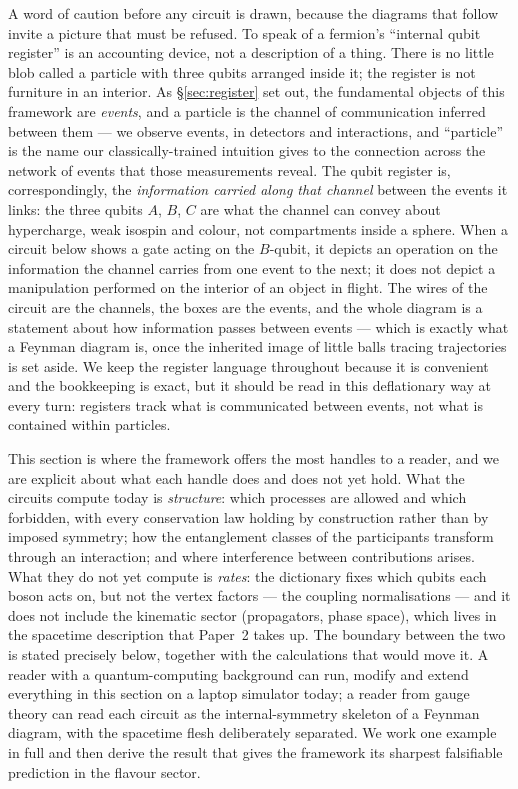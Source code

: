 A word of caution before any circuit is drawn, because the diagrams that follow invite a picture
that must be refused. To speak of a fermion's ``internal qubit register'' is an accounting device,
not a description of a thing. There is no little blob called a particle with three qubits arranged
inside it; the register is not furniture in an interior. As \S\ref{sec:register} set out, the
fundamental objects of this framework are \emph{events}, and a particle is the channel of
communication inferred between them --- we observe events, in detectors and interactions, and
``particle'' is the name our classically-trained intuition gives to the connection across the
network of events that those measurements reveal. The qubit register is, correspondingly, the
\emph{information carried along that channel} between the events it links: the three qubits
$A$, $B$, $C$ are what the channel can convey about hypercharge, weak isospin and colour, not
compartments inside a sphere. When a circuit below shows a gate acting on the $B$-qubit, it depicts
an operation on the information the channel carries from one event to the next; it does not depict a
manipulation performed on the interior of an object in flight. The wires of the circuit are the
channels, the boxes are the events, and the whole diagram is a statement about how information
passes between events --- which is exactly what a Feynman diagram is, once the inherited image of
little balls tracing trajectories is set aside. We keep the register language throughout because it
is convenient and the bookkeeping is exact, but it should be read in this deflationary way at every
turn: registers track what is communicated between events, not what is contained within particles.

This section is where the framework offers the most handles to a reader, and we are explicit about
what each handle does and does not yet hold. What the circuits compute today is \emph{structure}:
which processes are allowed and which forbidden, with every conservation law holding by construction
rather than by imposed symmetry; how the entanglement classes of the participants transform through
an interaction; and where interference between contributions arises. What they do not yet compute is
\emph{rates}: the dictionary fixes which qubits each boson acts on, but not the vertex factors ---
the coupling normalisations --- and it does not include the kinematic sector (propagators, phase
space), which lives in the spacetime description that Paper~2 takes up. The boundary between the two
is stated precisely below, together with the calculations that would move it. A reader with a
quantum-computing background can run, modify and extend everything in this section on a laptop
simulator today; a reader from gauge theory can read each circuit as the internal-symmetry skeleton
of a Feynman diagram, with the spacetime flesh deliberately separated. We work one example in full
and then derive the result that gives the framework its sharpest falsifiable prediction in the
flavour sector.

